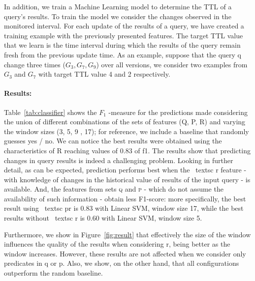 \documentclass[runningheads]{llncs}
\begin{document}

In addition, we train a Machine Learning model to determine the TTL of a query's results. To train the model we consider the changes observed in the monitored interval. For each update of the results of a query, we have created a training example with the previously presented features. The target TTL value that we learn is the time interval during which the results of the query remain fresh from the previous update time. As an example, suppose that the query q change three times ($G_{3}, G_{7}, G_{9}$) over all versions, we consider two examples from $G_{3}$ and $G_{7}$ with target TTL value 4 and 2 respectively.

\paragraph{Results:} Table~\ref{tab:classifier} shows the $F_1$ -measure for the predictions made considering the union of different combinations of the sets of features (Q, P, R) and varying the window sizes (3, 5, 9 , 17); for reference, we include a baseline that randomly guesses yes / no. 
We can notice the best results were obtained using the characteristics of R reaching values ​​of 0.83 of f1. The results show that predicting changes in query results is indeed a challenging problem. Looking in further detail, as can be expected, prediction performs best when the \ textsc {r} feature - with knowledge of changes in the historical value of results of the input query - is available. And, the features from sets \textsc {q} and  \textsc {p} - which do not assume the availability of such information - obtain less F1-score: more specifically, the best result using \ textsc {pr} is 0.83 with Linear SVM, window size 17, while the best results without \ textsc {r} is 0.60 with Linear SVM, window size 5.

Furthermore, we show in Figure~\ref{fig:result} that effectively the size of the window influences the quality of the results when considering r, being better as the window increases. However, these results are not affected when we consider only predicates in q or p. Also, we show, on the other hand, that all configurations outperform the random baseline.
\end{document}
